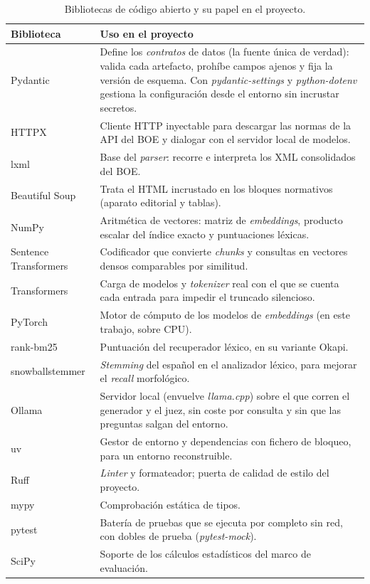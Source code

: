 \begin{table}[htbp]
\centering
\small
\renewcommand{\arraystretch}{1.2}
\caption{Bibliotecas de código abierto y su papel en el proyecto.}
\label{tab:tecnologias}
\begin{tabular}{p{}p{}}
\hline
\textbf{Biblioteca} & \textbf{Uso en el proyecto} \\
\hline
Pydantic \cite{pydantic} & Define los \emph{contratos} de datos (la fuente única de verdad): valida cada artefacto, prohíbe campos ajenos y fija la versión de esquema. Con \emph{pydantic-settings} y \emph{python-dotenv} gestiona la configuración desde el entorno sin incrustar secretos. \\
HTTPX \cite{httpx} & Cliente HTTP inyectable para descargar las normas de la API del BOE y dialogar con el servidor local de modelos. \\
lxml \cite{lxml} & Base del \emph{parser}: recorre e interpreta los XML consolidados del BOE. \\
Beautiful Soup \cite{beautifulsoup} & Trata el HTML incrustado en los bloques normativos (aparato editorial y tablas). \\
NumPy \cite{numpy} & Aritmética de vectores: matriz de \emph{embeddings}, producto escalar del índice exacto y puntuaciones léxicas. \\
Sentence Transformers \cite{sentencetransformers,reimers2019sbert} & Codificador que convierte \emph{chunks} y consultas en vectores densos comparables por similitud. \\
Transformers \cite{transformers} & Carga de modelos y \emph{tokenizer} real con el que se cuenta cada entrada para impedir el truncado silencioso. \\
PyTorch \cite{pytorch} & Motor de cómputo de los modelos de \emph{embeddings} (en este trabajo, sobre CPU). \\
rank-bm25 \cite{rankbm25} & Puntuación del recuperador léxico, en su variante Okapi. \\
snowballstemmer \cite{snowball} & \emph{Stemming} del español en el analizador léxico, para mejorar el \emph{recall} morfológico. \\
Ollama \cite{ollama} & Servidor local (envuelve \emph{llama.cpp}) sobre el que corren el generador y el juez, sin coste por consulta y sin que las preguntas salgan del entorno. \\
uv \cite{uv} & Gestor de entorno y dependencias con fichero de bloqueo, para un entorno reconstruible. \\
Ruff \cite{ruff} & \emph{Linter} y formateador; puerta de calidad de estilo del proyecto. \\
mypy \cite{mypy} & Comprobación estática de tipos. \\
pytest \cite{pytest} & Batería de pruebas que se ejecuta por completo sin red, con dobles de prueba (\emph{pytest-mock}). \\
SciPy \cite{scipy} & Soporte de los cálculos estadísticos del marco de evaluación. \\
\hline
\end{tabular}
\end{table}

